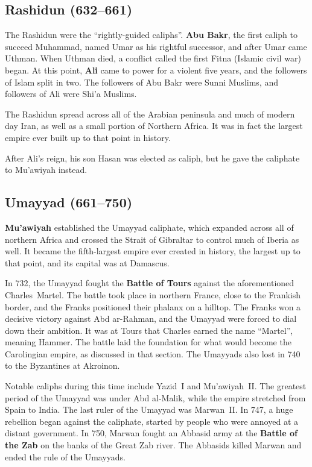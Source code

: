 \subsection*{Rashidun (632--661)}

The Rashidun were the ``rightly-guided caliphs''.
\textbf{Abu Bakr}, the first caliph to succeed Muhammad, named Umar as his rightful successor,
and after Umar came Uthman.
When Uthman died, a conflict called the first Fitna (Islamic civil war) began.
At this point, \textbf{Ali} came to power for a violent five years,
and the followers of Islam split in two.
The followers of Abu Bakr were Sunni Muslims, and followers of Ali were Shi'a Muslims.

The Rashidun spread across all of the Arabian peninsula and much of modern day Iran,
as well as a small portion of Northern Africa.
It was in fact the largest empire ever built up to that point in history.

After Ali's reign, his son Hasan was elected as caliph,
but he gave the caliphate to Mu'awiyah instead.

\subsection*{Umayyad (661--750)}

\textbf{Mu'awiyah} established the Umayyad caliphate,
which expanded across all of northern Africa
and crossed the Strait of Gibraltar to control much of Iberia as well.
It became the fifth-largest empire ever created in history, the largest up to that point,
and its capital was at Damascus.

In 732, the Umayyad fought the \textbf{Battle of Tours} against the aforementioned Charles~Martel.
The battle took place in northern France, close to the Frankish border,
and the Franks positioned their phalanx on a hilltop.
The Franks won a decisive victory against Abd ar-Rahman,
and the Umayyad were forced to dial down their ambition.
It was at Tours that Charles earned the name ``Martel'', meaning Hammer.
The battle laid the foundation for what would become the Carolingian empire,
as discussed in that section.
The Umayyads also lost in 740 to the Byzantines at Akroinon.

Notable caliphs during this time include Yazid~I and Mu'awiyah~II\@.
The greatest period of the Umayyad was under Abd al-Malik, while the empire stretched from Spain to India.
The last ruler of the Umayyad was Marwan~II\@.
In 747, a huge rebellion began against the caliphate,
started by people who were annoyed at a distant government.
In 750, Marwan fought an Abbasid army at the \textbf{Battle of the Zab}
on the banks of the Great Zab river.
The Abbasids killed Marwan and ended the rule of the Umayyads.

